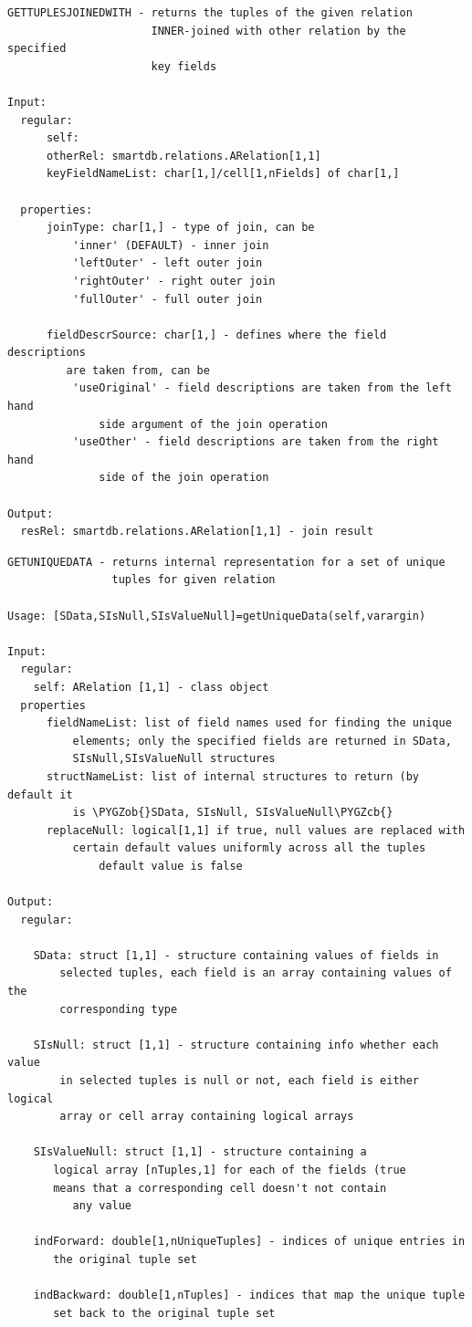 \documentclass[letterpaper,10pt,english]{sphinxmanual}
\def\PYGZob{\char`\{}
\def\PYGZcb{\char`\}}
\begin{document}
\begin{Verbatim}[commandchars=\\\{\}]
GETTUPLESJOINEDWITH - returns the tuples of the given relation
                      INNER-joined with other relation by the specified
                      key fields

Input:
  regular:
      self:
      otherRel: smartdb.relations.ARelation[1,1]
      keyFieldNameList: char[1,]/cell[1,nFields] of char[1,]

  properties:
      joinType: char[1,] - type of join, can be
          'inner' (DEFAULT) - inner join
          'leftOuter' - left outer join
          'rightOuter' - right outer join
          'fullOuter' - full outer join

      fieldDescrSource: char[1,] - defines where the field descriptions
         are taken from, can be
          'useOriginal' - field descriptions are taken from the left hand
              side argument of the join operation
          'useOther' - field descriptions are taken from the right hand
              side of the join operation

Output:
  resRel: smartdb.relations.ARelation[1,1] - join result
\end{Verbatim}
\label{chap_func:smartdb-relations-atypifiedstaticrelation-getuniquedata}
\begin{Verbatim}[commandchars=\\\{\}]
GETUNIQUEDATA - returns internal representation for a set of unique
                tuples for given relation

Usage: [SData,SIsNull,SIsValueNull]=getUniqueData(self,varargin)

Input:
  regular:
    self: ARelation [1,1] - class object
  properties
      fieldNameList: list of field names used for finding the unique
          elements; only the specified fields are returned in SData,
          SIsNull,SIsValueNull structures
      structNameList: list of internal structures to return (by default it
          is \PYGZob{}SData, SIsNull, SIsValueNull\PYGZcb{}
      replaceNull: logical[1,1] if true, null values are replaced with
          certain default values uniformly across all the tuples
              default value is false

Output:
  regular:

    SData: struct [1,1] - structure containing values of fields in
        selected tuples, each field is an array containing values of the
        corresponding type

    SIsNull: struct [1,1] - structure containing info whether each value
        in selected tuples is null or not, each field is either logical
        array or cell array containing logical arrays

    SIsValueNull: struct [1,1] - structure containing a
       logical array [nTuples,1] for each of the fields (true
       means that a corresponding cell doesn't not contain
          any value

    indForward: double[1,nUniqueTuples] - indices of unique entries in
       the original tuple set

    indBackward: double[1,nTuples] - indices that map the unique tuple
       set back to the original tuple set
\end{Verbatim}
\end{document}
